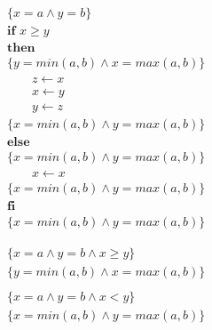 \begin{frame}
  \begin{align*}
    &\{x=a\land y=b\}\\
    &\textbf{if } x\ge y\\
    &\textbf{then}\\
    &\{y=min(a,b)\land x=max(a,b)\}\\
    & \qquad z\leftarrow x\\
    & \qquad x\leftarrow y\\
    & \qquad y\leftarrow z\\
    &\{x=min(a,b)\land y=max(a,b)\}\\
    &\textbf{else}\\
    &\{x=min(a,b)\land y=max(a,b)\}\\
    & \qquad x\leftarrow x\\
    &\{x=min(a,b)\land y=max(a,b)\}\\
    &\textbf{fi}\\
    &\{x=min(a,b)\land y=max(a,b)\}
  \end{align*}
\end{frame}

\begin{frame}
  \begin{align*}
    &\{x=a\land y=b\land x\geq y\}\\
    &\{y=min(a,b)\land x=max(a,b)\}\\
  \end{align*}
  \begin{align*}
    &\{x=a\land y=b\land x< y\}\\
    &\{x=min(a,b)\land y=max(a,b)\}\\
  \end{align*}
\end{frame}
